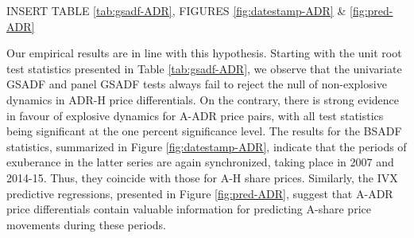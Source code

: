 \documentclass[11pt]{article}
\begin{document}
\bigskip
\begin{center}
INSERT TABLE \ref{tab:gsadf-ADR}, FIGURES \ref{fig:datestamp-ADR} \& \ref{fig:pred-ADR}  
\end{center}
\bigskip

Our empirical results are in line with this hypothesis. Starting with the unit root test statistics presented in Table \ref{tab:gsadf-ADR}, we observe that the univariate GSADF and panel GSADF tests always fail to reject the null of non-explosive dynamics in ADR-H price differentials. On the contrary, there is strong evidence in favour of explosive dynamics for A-ADR price pairs, with all test statistics being significant at the one percent significance level. The results for the BSADF statistics, summarized in Figure \ref{fig:datestamp-ADR}, indicate that the periods of exuberance in the latter series are again synchronized, taking place in 2007 and 2014-15. Thus, they coincide with those for A-H share prices. Similarly, the IVX predictive regressions, presented in Figure \ref{fig:pred-ADR}, suggest that A-ADR price differentials contain valuable information for predicting A-share price movements during these periods. 




\end{document}
